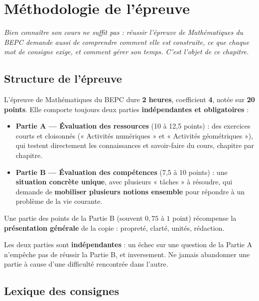 \chapter{Méthodologie de l'épreuve}

\noindent\textit{Bien connaître son cours ne suffit pas : réussir l'épreuve de
Mathématiques du BEPC demande aussi de comprendre comment elle est construite, ce que
chaque mot de consigne exige, et comment gérer son temps. C'est l'objet de ce chapitre.}
\vspace{8pt}

\section{Structure de l'épreuve}

\begin{propriete}
L'épreuve de Mathématiques du BEPC dure \textbf{2 heures}, coefficient \textbf{4}, notée
sur \textbf{20 points}. Elle comporte toujours deux parties \textbf{indépendantes et
obligatoires} :
\begin{itemize}
\item \textbf{Partie A — Évaluation des ressources} (10 à 12,5 points) : des exercices
courts et cloisonnés (« Activités numériques » et « Activités géométriques »), qui testent
directement les connaissances et savoir-faire du cours, chapitre par chapitre.
\item \textbf{Partie B — Évaluation des compétences} (7,5 à 10 points) : une \textbf{situation
concrète unique}, avec plusieurs « tâches » à résoudre, qui demande de \textbf{mobiliser
plusieurs notions ensemble} pour répondre à un problème de la vie courante.
\end{itemize}
Une partie des points de la Partie B (souvent $0{,}75$ à $1$ point) récompense la
\textbf{présentation générale} de la copie : propreté, clarté, unités, rédaction.
\end{propriete}

\begin{remarque}
Les deux parties sont \textbf{indépendantes} : un échec sur une question de la Partie A
n'empêche pas de réussir la Partie B, et inversement. Ne jamais abandonner une partie à
cause d'une difficulté rencontrée dans l'autre.
\end{remarque}

\section{Lexique des consignes}

